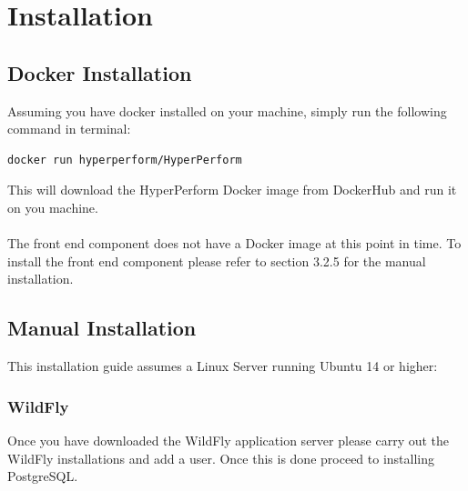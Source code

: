\documentclass[11pt,a4paper]{article}
\begin{document}
\section{Installation}

\subsection{Docker Installation}

Assuming you have docker installed on your machine, simply run the following command in terminal: 

\begin{lstlisting}[language=bash]
docker run hyperperform/HyperPerform 
\end{lstlisting}
This will download the HyperPerform Docker image from DockerHub and run it on you machine. \\ \\
The front end component does not have a Docker image at this point in time. To install the front end component please refer to section 3.2.5 for the manual installation.

\subsection{Manual Installation}
This installation guide assumes a Linux Server running Ubuntu 14 or higher:

\subsubsection{WildFly}
Once you have downloaded the WildFly application server please carry out the WildFly installations and add a user. Once this is done proceed to installing PostgreSQL.

\end{document}
